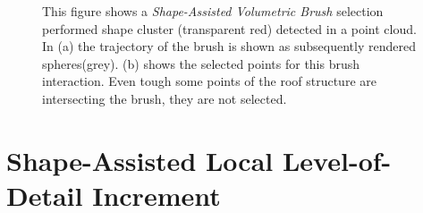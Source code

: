 \begin{figure}
\centering
{}\par\medskip
{}
\caption{This figure shows a \textit{Shape-Assisted Volumetric Brush} selection performed shape cluster (transparent red) detected in a point cloud. In (a) the trajectory of the brush is shown as subsequently rendered spheres(grey). (b) shows the selected points for this brush interaction. Even tough some points of the roof structure are intersecting the brush, they are not selected. }
\label{fig:brush}
\end{figure}



\section{Shape-Assisted Local Level-of-Detail Increment}

